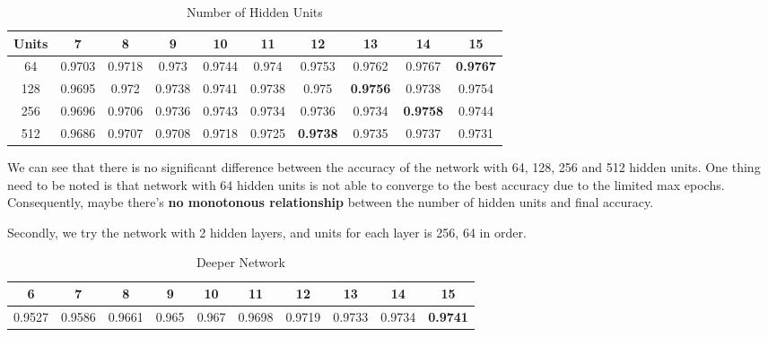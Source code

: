 \documentclass[a4paper, 11pt]{article} %
\begin{document}
\begin{table}[H]
    \begin{center}
        \begin{tabular}{cccccccccc}
            \toprule
            Units & 7      & 8      & 9      & 10     & 11     & 12              & 13              & 14              & 15              \\
            \midrule
            64    & 0.9703 & 0.9718 & 0.973  & 0.9744 & 0.974  & 0.9753          & 0.9762          & 0.9767          & \textbf{0.9767} \\
            128   & 0.9695 & 0.972  & 0.9738 & 0.9741 & 0.9738 & 0.975           & \textbf{0.9756} & 0.9738          & 0.9754          \\
            256   & 0.9696 & 0.9706 & 0.9736 & 0.9743 & 0.9734 & 0.9736          & 0.9734          & \textbf{0.9758} & 0.9744          \\
            512   & 0.9686 & 0.9707 & 0.9708 & 0.9718 & 0.9725 & \textbf{0.9738} & 0.9735          & 0.9737          & 0.9731          \\
            \bottomrule
        \end{tabular}
        \caption{Number of Hidden Units}
    \end{center}
\end{table}

We can see that there is no significant difference between the accuracy of the network with
64, 128, 256 and 512 hidden units. One thing need to be noted is that network with 64 hidden
units is not able to converge to the best accuracy due to the limited max epochs. Consequently,
maybe there's \textbf{no monotonous relationship} between the number of hidden units and final
accuracy.

Secondly, we try the network with 2 hidden layers, and units for each layer is 256, 64 in order.

\begin{table}[H]
    \begin{center}
        \begin{tabular}{cccccccccc}
            \toprule
            6      & 7      & 8      & 9     & 10    & 11     & 12     & 13     & 14     & 15              \\
            \midrule
            0.9527 & 0.9586 & 0.9661 & 0.965 & 0.967 & 0.9698 & 0.9719 & 0.9733 & 0.9734 & \textbf{0.9741} \\
            \bottomrule
        \end{tabular}
        \caption{Deeper Network}
    \end{center}
\end{table}
\end{document}
